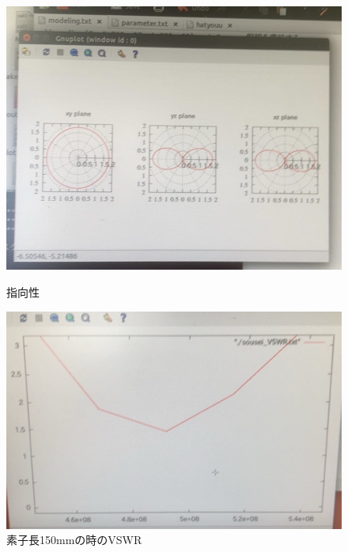 \documentclass[dvipdfmx,autodetect-engine,titlepage]{jsarticle}
\begin{document}
\begin{figure}[h]
  \centering
  \begin{minipage}[b]{0.45\linewidth}
  \begin{center}
    \includegraphics[keepaspectratio,scale=0.2]{pic8.jpg}
    \end{center}
    \caption{指向性}
  \end{minipage}
  \begin{minipage}[b]{0.45\linewidth}
  \begin{center}
    \includegraphics[keepaspectratio,scale=0.2]{pic7.jpg}
    \end{center}
    \caption{素子長150mmの時のVSWR}
  \end{minipage}
\end{figure}
\end{document}
